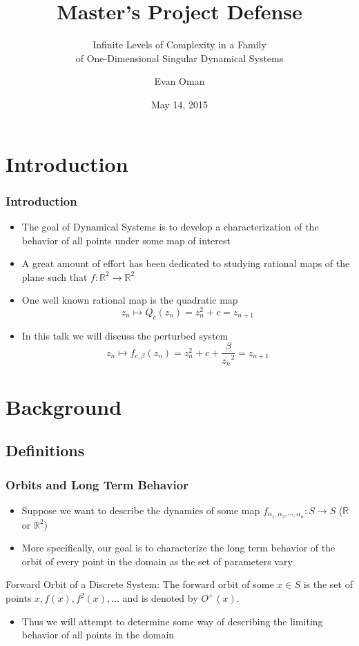 \documentclass{beamer}
\title{Master's Project Defense}
\subtitle{Infinite Levels of Complexity in a Family\\ of One-Dimensional Singular Dynamical Systems}
\author{Evan Oman}
\institute{\normalsize University of Minnesota Duluth}
\date{May 14, 2015}
\newcommand{\R}{\mathbb{R}}
\newcommand{\<}{\left\langle}
\renewcommand{\>}{\right\rangle} %
\renewcommand{\*}{\cdot} %
\newcommand{\ra}{\rightarrow}
\begin{document}
\maketitle

\tableofcontents

\section{Introduction}
\begin{frame}
	\frametitle{Introduction}
	\begin{itemize}
		\item The goal of Dynamical Systems is to develop a characterization of the behavior of all points under some map of interest
		\item A great amount of effort has been dedicated to studying rational maps of the plane such that $f: \R^2 \ra \R^2$
		\item One well known rational map is the quadratic map 
		\[z_n \mapsto Q_c (z_n) = z_n^2 + c = z_{n+1}\]
		\item In this talk we will discuss the perturbed system 
		\[z_n \mapsto f_{c, \beta} (z_n) = z_n^2 + c + \frac{\beta}{\overline{z_n}^2} = z_{n+1}\]
	\end{itemize}
\end{frame}

\section{Background}
\subsection{Definitions}
\begin{frame}
	\frametitle{Orbits and Long Term Behavior}
	\begin{itemize}
		\item Suppose we want to describe the dynamics of some map $f_{\alpha_1,\alpha_2, \cdots, \alpha_n} : S\ra S$ ($\R$ or $\R^2$)
		\item More specifically, our goal is to characterize the long term behavior of the orbit of every point in the domain as the set of parameters vary
	\end{itemize}

	\begin{definition}{Forward Orbit of a Discrete System\cite{Dev2}:}
		The forward orbit of some $x \in S$ is the set of points $x, f (x), f^2 (x),\ldots$ and is denoted by $O^+ (x)$.
	\end{definition}

	\begin{itemize}
		\item Thus we will attempt to determine some way of describing the limiting behavior of all points in the domain
	\end{itemize}
\end{frame}
\end{document}
